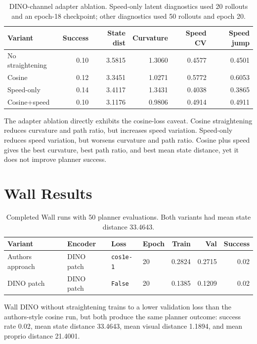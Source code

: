 \documentclass[11pt]{article}
\begin{document}
\begin{table}[h]
\centering
\begin{tabular}{lrrrrr}
\toprule
Variant & Success & State dist & Curvature & Speed CV & Speed jump \\
\midrule
No straightening & 0.10 & 3.5815 & 1.3060 & 0.4577 & 0.4501 \\
Cosine & 0.12 & 3.3451 & 1.0271 & 0.5772 & 0.6053 \\
Speed-only & 0.14 & 3.4117 & 1.3431 & 0.4038 & 0.3865 \\
Cosine+speed & 0.10 & 3.1176 & 0.9806 & 0.4914 & 0.4911 \\
\bottomrule
\end{tabular}
\caption{DINO-channel adapter ablation. Speed-only latent diagnostics used 20 rollouts and an epoch-18 checkpoint; other diagnostics used 50 rollouts and epoch 20.}
\end{table}

The adapter ablation directly exhibits the cosine-loss caveat. Cosine straightening reduces curvature and path ratio, but increases speed variation. Speed-only reduces speed variation, but worsens curvature and path ratio. Cosine plus speed gives the best curvature, best path ratio, and best mean state distance, yet it does not improve planner success.

\section{Wall Results}

\begin{table}[h]
\centering
\begin{tabular}{llllrrr}
\toprule
Variant & Encoder & Loss & Epoch & Train & Val & Success \\
\midrule
Authors approach & DINO patch & \texttt{cos1e-1} & 20 & 0.2824 & 0.2715 & 0.02 \\
DINO patch & DINO patch & \texttt{False} & 20 & 0.1385 & 0.1209 & 0.02 \\
\bottomrule
\end{tabular}
\caption{Completed Wall runs with 50 planner evaluations. Both variants had mean state distance 33.4643.}
\end{table}

Wall DINO without straightening trains to a lower validation loss than the authors-style cosine run, but both produce the same planner outcome: success rate 0.02, mean state distance 33.4643, mean visual distance 1.1894, and mean proprio distance 21.4001.
\end{document}
